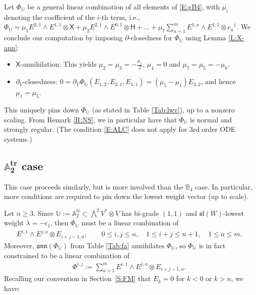 \documentclass[pdftex]{sigma}%
\newcommand\tensor{\otimes}
\DeclareMathOperator{\tr}{tr}
\newcommand\fann{\mathfrak{ann}}
\newcommand\fsl{\mathfrak{sl}}
\newcommand\bbU{\mathbb{U}}
\newcommand\bbA{\mathbb{A}}
\newcommand\bbB{\mathbb{B}}
\newcommand\sfX{\mathsf{X}}
\newcommand\sfH{\mathsf{H}}
\numberwithin{equation}{section}
\begin{document}
Let $\Phi_{\bbU}$ be a general linear combination of all elements of \eqref{E:gB4}, with $\mu_i$ denoting the coefficient of the $i$-th term, i.e., $\Phi_{\bbU} = \mu_1 E^{2,1} \wedge E^{1,1} \tensor \sfX + \mu_2 E^{2,1} \wedge E^{0,1} \tensor \sfH + \dots + \mu_7 \sum_{a=1}^m E^{1,a} \wedge E^{1,1} \tensor e_a{}^1$. We conclude our computation by imposing $\partial$-closedness for $\Phi_{\bbU}$ using
Lemma \ref{L:X-ann}:
 \begin{itemize}\itemsep=0pt
 \item $\sfX$-annihilation: This yields $\mu_2 = \mu_3 = -\frac{\mu_1}{2}$,
$\mu_4 = 0$ and $\mu_7 =\mu_5= -\mu_6$.
 \item $\partial_V$-closedness: $0=\partial_V\Phi_{\bbU}(E_{1,2},E_{2,1},E_{1,1}) = (\mu_5-\mu_1)E_{2,2}$, and hence $\mu_1 = \mu_5$.
 \end{itemize}
 This uniquely pins down $\Phi_{\bbU}$ (as stated in Table \ref{Tab:lwv}), up to a nonzero scaling. From Remark \ref{R:NS}, we in particular have that $\Phi_{\bbU}$ is normal and strongly regular. (The condition \eqref{E:ALC} does not apply for 3rd order ODE systems.)

\subsection[A\_2\^{}\{tr\} case]{$\boldsymbol{\bbA_2^{\tr}}$ case}
\label{S:Phitr}
This case proceeds similarly, but is more involved than the $\bbB_4$ case. In particular, more conditions are required to pin down the lowest weight vector (up to scale).

Let $n \geq 3$. Since $\bbU := \bbA_2^{\tr} \subset \bigwedge^2 V^* \otimes V$ has bi-grade $(1,1)$ and $\fsl(W)$-lowest weight $\lambda = -\epsilon_1$, then $\Phi_\bbU$ must be a linear combination of
\begin{align*}%
E^{i,1} \wedge E^{j,a} \tensor E_{i+j-1,a}, \qquad 0 \le i, j \le n, \quad 1 \le i+j \le n+1,\quad 1 \le a \le m.
\end{align*}
Moreover, $\fann(\Phi_{\bbU})$ from Table \ref{Tab:fa} annihilates $\Phi_\bbU$, so $\Phi_{\bbU}$ is in fact constrained to be a linear combination of
\begin{align} \label{E:Phi_ij}
\Phi^{i,j} := \sum_{a=1}^m E^{i,1}\wedge E^{j,a}\tensor E_{i+j-1,a}.
\end{align}
Recalling our convention in Section~\ref{S:FM} that $E_k = 0$ for $k < 0$ or $k > n$, we have:
\end{document}
